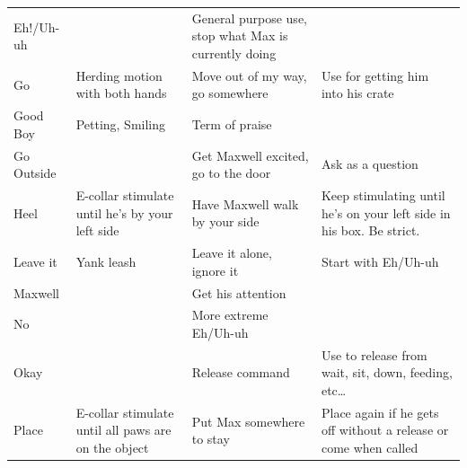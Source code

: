 \documentclass[pdftex,12pt]{article}
\begin{document}
\begin{table}[H]
\begin{adjustwidth}{-4.5cm}{-4.5cm}
\begin{center}
\begin{tabular}{lp{}p{}p{}}
\rowcolor{gray!25} Eh!/Uh-uh  &                                                                  & General purpose use, stop what Max is currently doing &                                                                      \\
\rowcolor{white}   Go         & Herding motion with both hands                                   & Move out of my way, go somewhere                      & Use for getting him into his crate                                   \\
\rowcolor{gray!25} Good Boy   & Petting, Smiling                                                 & Term of praise                                        &                                                                      \\
\rowcolor{white}   Go Outside &                                                                  & Get Maxwell excited, go to the door                   & Ask as a question                                                    \\
\rowcolor{gray!25} Heel       & E-collar stimulate until he's by your left side                  & Have Maxwell walk by your side                        & Keep stimulating until he's on your left side in his box. Be strict. \\
\rowcolor{white}   Leave it   & Yank leash                                                       & Leave it alone, ignore it                             & Start with Eh/Uh-uh                                                  \\
\rowcolor{gray!25} Maxwell    &                                                                  & Get his attention                                     &                                                                      \\
\rowcolor{white}   No         &                                                                  & More extreme Eh/Uh-uh                                 &                                                                      \\
\rowcolor{gray!25} Okay       &                                                                  & Release command                                       & Use to release from wait, sit, down, feeding, etc\ldots              \\
\rowcolor{white}   Place      & E-collar stimulate until all paws are on the object              & Put Max somewhere to stay                             & Place again if he gets off without a release or come when called     \\

\end{tabular}
\end{center}
\end{adjustwidth}
\end{table}
\end{document}
